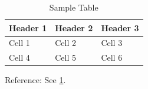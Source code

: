 \documentclass{article}
\begin{document}
\begin{table}[h]
\centering
\caption{Sample Table}
\label{tab:sample}
\begin{tabular}{lll}
\toprule
Header 1 & Header 2 & Header 3 \\
\midrule
Cell 1 & Cell 2 & Cell 3 \\
Cell 4 & Cell 5 & Cell 6 \\
\bottomrule
\end{tabular}
\end{table}

Reference: See \ref{tab:sample}.
\end{document}
